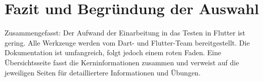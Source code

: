 \section{Fazit und Begründung der Auswahl}
\label{sec:Fazit-und-Begründung-der-Auswahl}


Zusammengefasst: Der Aufwand der Einarbeitung in das Testen in Flutter ist gering.
Alle Werkzeuge werden vom Dart- und Flutter-Team bereitgestellt.
Die Dokumentation ist umfangreich, folgt jedoch einem roten Faden.
Eine Übersichtsseite fasst die Kerninformationen zusammen und verweist auf die jeweiligen  Seiten für detailliertere Informationen und Übungen.